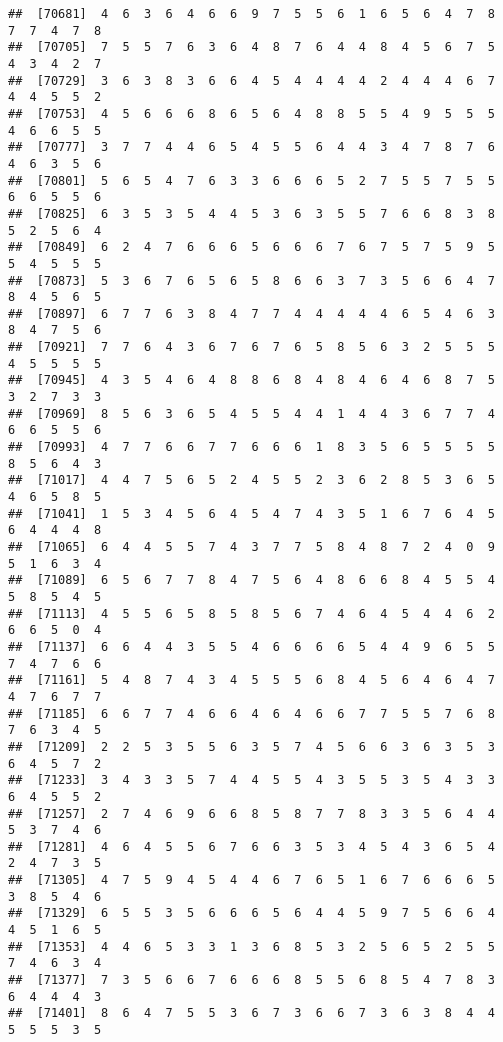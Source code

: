 \documentclass[
]{book}
\begin{document}
\begin{verbatim}
##  [70681]  4  6  3  6  4  6  6  9  7  5  5  6  1  6  5  6  4  7  8  7  7  4  7  8
##  [70705]  7  5  5  7  6  3  6  4  8  7  6  4  4  8  4  5  6  7  5  4  3  4  2  7
##  [70729]  3  6  3  8  3  6  6  4  5  4  4  4  4  2  4  4  4  6  7  4  4  5  5  2
##  [70753]  4  5  6  6  6  8  6  5  6  4  8  8  5  5  4  9  5  5  5  4  6  6  5  5
##  [70777]  3  7  7  4  4  6  5  4  5  5  6  4  4  3  4  7  8  7  6  4  6  3  5  6
##  [70801]  5  6  5  4  7  6  3  3  6  6  6  5  2  7  5  5  7  5  5  6  6  5  5  6
##  [70825]  6  3  5  3  5  4  4  5  3  6  3  5  5  7  6  6  8  3  8  5  2  5  6  4
##  [70849]  6  2  4  7  6  6  6  5  6  6  6  7  6  7  5  7  5  9  5  5  4  5  5  5
##  [70873]  5  3  6  7  6  5  6  5  8  6  6  3  7  3  5  6  6  4  7  8  4  5  6  5
##  [70897]  6  7  7  6  3  8  4  7  7  4  4  4  4  4  6  5  4  6  3  8  4  7  5  6
##  [70921]  7  7  6  4  3  6  7  6  7  6  5  8  5  6  3  2  5  5  5  4  5  5  5  5
##  [70945]  4  3  5  4  6  4  8  8  6  8  4  8  4  6  4  6  8  7  5  3  2  7  3  3
##  [70969]  8  5  6  3  6  5  4  5  5  4  4  1  4  4  3  6  7  7  4  6  6  5  5  6
##  [70993]  4  7  7  6  6  7  7  6  6  6  1  8  3  5  6  5  5  5  5  8  5  6  4  3
##  [71017]  4  4  7  5  6  5  2  4  5  5  2  3  6  2  8  5  3  6  5  4  6  5  8  5
##  [71041]  1  5  3  4  5  6  4  5  4  7  4  3  5  1  6  7  6  4  5  6  4  4  4  8
##  [71065]  6  4  4  5  5  7  4  3  7  7  5  8  4  8  7  2  4  0  9  5  1  6  3  4
##  [71089]  6  5  6  7  7  8  4  7  5  6  4  8  6  6  8  4  5  5  4  5  8  5  4  5
##  [71113]  4  5  5  6  5  8  5  8  5  6  7  4  6  4  5  4  4  6  2  6  6  5  0  4
##  [71137]  6  6  4  4  3  5  5  4  6  6  6  6  5  4  4  9  6  5  5  7  4  7  6  6
##  [71161]  5  4  8  7  4  3  4  5  5  5  6  8  4  5  6  4  6  4  7  4  7  6  7  7
##  [71185]  6  6  7  7  4  6  6  4  6  4  6  6  7  7  5  5  7  6  8  7  6  3  4  5
##  [71209]  2  2  5  3  5  5  6  3  5  7  4  5  6  6  3  6  3  5  3  6  4  5  7  2
##  [71233]  3  4  3  3  5  7  4  4  5  5  4  3  5  5  3  5  4  3  3  6  4  5  5  2
##  [71257]  2  7  4  6  9  6  6  8  5  8  7  7  8  3  3  5  6  4  4  5  3  7  4  6
##  [71281]  4  6  4  5  5  6  7  6  6  3  5  3  4  5  4  3  6  5  4  2  4  7  3  5
##  [71305]  4  7  5  9  4  5  4  4  6  7  6  5  1  6  7  6  6  6  5  3  8  5  4  6
##  [71329]  6  5  5  3  5  6  6  6  5  6  4  4  5  9  7  5  6  6  4  4  5  1  6  5
##  [71353]  4  4  6  5  3  3  1  3  6  8  5  3  2  5  6  5  2  5  5  7  4  6  3  4
##  [71377]  7  3  5  6  6  7  6  6  6  8  5  5  6  8  5  4  7  8  3  6  4  4  4  3
##  [71401]  8  6  4  7  5  5  3  6  7  3  6  6  7  3  6  3  8  4  4  5  5  5  3  5

\end{verbatim}
\end{document}
